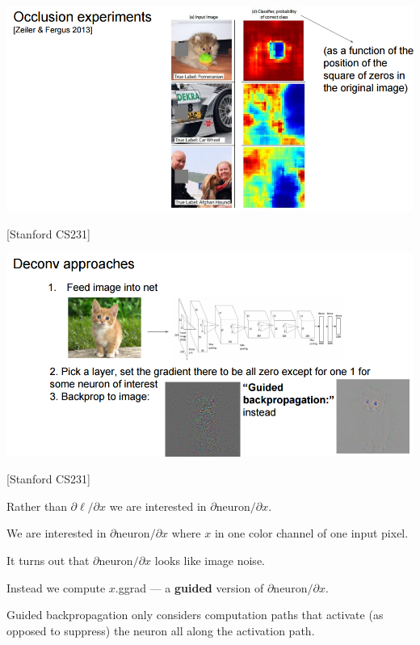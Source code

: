 {\slide{}

\centerline{\includegraphics[width = 9.5in]{../images/Occlusion}}
\centerline{[Stanford CS231]}


\centerline{\includegraphics[width = 9.5in]{../images/DeconvAnalysis}}
\centerline{[Stanford CS231]}


Rather than $\partial \ell/ \partial x$ we are interested in $\partial \mathrm{neuron}/\partial x$.

\vfill
We are interested in $\partial \mathrm{neuron}/\partial x$ where $x$ in one color channel of one input pixel.

\vfill
It turns out that $\partial \mathrm{neuron}/\partial x$ looks like image noise.

\vfill
Instead we compute $x$.ggrad  --- a {\bf guided} version of $\partial \mathrm{neuron}/\partial x$.


\vfill
Guided backpropagation only considers computation paths that activate (as opposed to suppress) the neuron all along the activation path.

}
